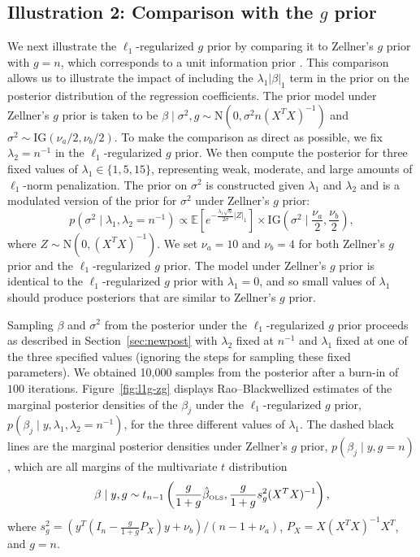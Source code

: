 \documentclass[12pt]{article}
\begin{document}
 

\subsection{Illustration 2: Comparison with the $g$ prior}\label{sec:fixedg}
We next illustrate the $\ell_1$-regularized $g$ prior by comparing it to Zellner's $g$ prior
with $g = n$, which corresponds to a unit information prior \citep{kass:95, fern:01}.
This comparison allows us to illustrate the impact of including the $\lambda_1 |\beta|_1$ term 
in the prior on the posterior distribution of the regression coefficients. 
The prior model under Zellner's $g$ prior is taken to be $\beta \mid \sigma^2, g \sim 
\mbox{N}(0, \sigma^2 n (X^TX)^{-1})$ and $\sigma^2 \sim \mbox{IG}(\nu_a/2, \nu_b/2)$. To 
make the comparison as direct as possible, we fix $\lambda_2 = n^{-1}$ in the $\ell_1$-regularized 
$g$ prior.  We then compute the posterior for three fixed values of $\lambda_1 \in \{1, 5, 15\}$, 
representing weak, moderate, and large amounts of $\ell_1$-norm penalization. The prior on $\sigma^2$
is constructed given $\lambda_1$ and $\lambda_2$ and is a modulated version of the prior
for $\sigma^2$ under Zellner's $g$ prior:
\[
	p(\sigma^2 \mid \lambda_1, \lambda_2 = n^{-1}) \propto
		\mathbb{E}\left[e^{-\frac{\lambda_1\sqrt{n}}{2\sigma}|Z|_1}\right] \times
		\mbox{IG}\left(\sigma^2 \mid \frac{\nu_a}{2}, \frac{\nu_b}{2}\right),
\]
where $Z \sim \mbox{N}(0, (X^TX)^{-1})$. 
We set $\nu_a = 10$ and $\nu_b = 4$ for both Zellner's $g$ prior and the $\ell_1$-regularized
$g$ prior. The model under Zellner's $g$ prior is identical to the $\ell_1$-regularized $g$ prior
with $\lambda_1=0$, and so small values of $\lambda_1$ should produce posteriors that are 
similar to Zellner's $g$ prior.

Sampling $\beta$ and $\sigma^2$ from the posterior under the $\ell_1$-regularized
$g$ prior proceeds as described in Section~\ref{sec:newpost} with $\lambda_2$ fixed at $n^{-1}$
and $\lambda_1$ fixed at one of the three specified values (ignoring the steps for sampling
these fixed parameters). We obtained 10,000 samples from the posterior after a burn-in of $100$ 
iterations. Figure~\ref{fig:l1g-zg} displays Rao--Blackwellized estimates of the marginal posterior 
densities of the $\beta_j$ under the $\ell_1$-regularized $g$ prior, 
$p(\beta_j \mid y, \lambda_1, \lambda_2 = n^{-1})$, for the three different values of $\lambda_1$.
The dashed black lines are the marginal posterior densities under Zellner's $g$ prior,
$p(\beta_j \mid y, g = n)$, which are all margins of the multivariate $t$ distribution
\[
	\beta \mid y, g \sim t_{n-1}\left( \frac{g}{1+g}\hat{\beta}_{\mbox{\tiny OLS}},
		\frac{g}{1+g} s^2_g (X^TX)^{-1} \right),
\]
where $s^2_g = (y^T(I_n - \frac{g}{1+g}P_X)y + \nu_b)/(n-1+\nu_a)$, $P_X = X(X^TX)^{-1}X^T$,
and $g=n$.
\end{document}
